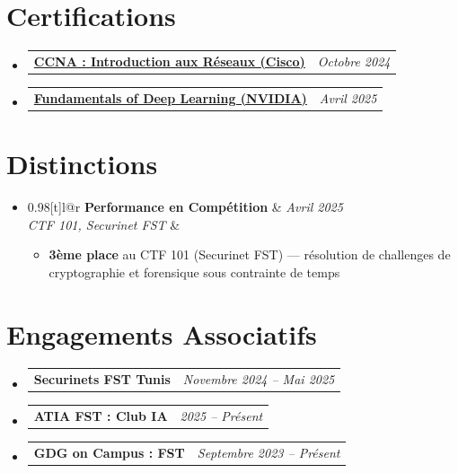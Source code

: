 \documentclass[a4paper,10pt]{article}
\makeatletter
\newcommand{\resumePOR}[3]{
\vspace{0.5mm}\item
    \begin{tabular*}{0.97\textwidth}[t]{l@{\extracolsep{\fill}}r}
        \textbf{#1}\hspace{0.3mm}#2 & \textit{\small{#3}}
    \end{tabular*}
    \vspace{-2mm}
}
\newcommand{\resumeProject}[4]{
\vspace{0.5mm}\item
    \begin{tabular*}{0.98\textwidth}[t]{l@{\extracolsep{\fill}}r}
        \textbf{#1} & \textit{\footnotesize{#3}} \\
        \footnotesize{\textit{#2}} & \footnotesize{#4}
    \end{tabular*}
    \vspace{-2.4mm}
}
\newcommand{\resumeSubHeadingListStart}{\begin{itemize}[leftmargin=*,labelsep=1mm]}
\newcommand{\resumeItemListStart}{\begin{itemize}[leftmargin=*,labelsep=1mm,itemsep=0.5mm]}
\newcommand{\resumeSubHeadingListEnd}{\end{itemize}\vspace{2mm}}
\newcommand{\resumeItemListEnd}{\end{itemize}\vspace{-2mm}}
\makeatother
\begin{document}
\section{\textbf{Certifications}}
\vspace{-0.2mm}
\resumeSubHeadingListStart
\resumePOR{}{\href{https://www.linkedin.com/in/fares-dkhili-018b17303/recent-activity/all/}{
\textbf{CCNA : Introduction aux R\'eseaux (Cisco)}
}}{Octobre 2024}
\resumePOR{}{\href{https://learn.nvidia.com/certificates?id=Z4jS_G2wT_uK63hkrrwHAw}{
\textbf{Fundamentals of Deep Learning (NVIDIA)}
}}{Avril 2025}
\resumeSubHeadingListEnd
\vspace{-6mm}

\section{\textbf{Distinctions}}
\vspace{-0.4mm}
\resumeSubHeadingListStart
\resumeProject
  {Performance en Comp\'etition}
  {CTF 101, Securinet FST}
  {Avril 2025}
  {{}\href{https://www.linkedin.com/posts/fares-dkhili-018b17303_cybersecurity-ctf-activity-7322699787982528512-YMcf?utm_source=share&utm_medium=member_desktop&rcm=ACoAAE2V9FQBl97M7EPoPtI-0a16X0hT_ahlsmk}{\textcolor{darkblue}{\faIcon{globe}}}}
\resumeItemListStart
  \item \textbf{3\`eme place} au CTF 101 (Securinet FST) --- r\'esolution de challenges de cryptographie et forensique sous contrainte de temps
\resumeItemListEnd
\resumeSubHeadingListEnd

\vspace{-6mm}
\section{\textbf{Engagements Associatifs}}
\vspace{-0.4mm}
\resumeSubHeadingListStart
\resumePOR{Securinets FST Tunis}
    {}
    {Novembre 2024 -- Mai 2025}
\resumePOR{ATIA FST : Club IA}
    {}
    {2025 -- Pr\'esent}
\resumePOR{GDG on Campus : FST}
    {}
    {Septembre 2023 -- Pr\'esent}
\resumeSubHeadingListEnd
\vspace{-6mm}
\end{document}
